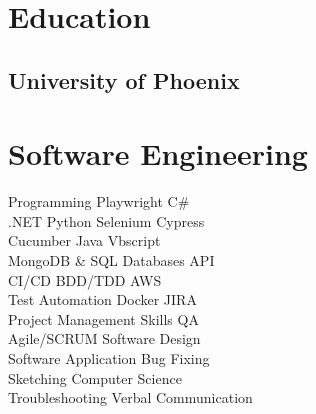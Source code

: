 \documentclass[hmargin=1.25cm, vmargin=0.75cm, scale=0.92]{deedy-resume-openfont}
\begin{document}
\lastupdated


\begin{minipage}[t]{0.33\textwidth}

\section{Education}
\subsection{University of Phoenix}
\sectionsep

\section{Software Engineering}
Programming \textbullet{} Playwright \textbullet{} C\# \\
.NET \textbullet{} Python \textbullet{} Selenium \textbullet{} Cypress \\
Cucumber \textbullet{} Java \textbullet{} Vbscript \\
MongoDB \& SQL Databases \textbullet{} API \\
CI/CD \textbullet{} BDD/TDD \textbullet{} AWS \\
Test Automation \textbullet{} Docker \textbullet{} JIRA \\
Project Management Skills \textbullet{} QA \\
Agile/SCRUM \textbullet{} Software Design \\
Software Application \textbullet{} Bug Fixing \\
Sketching \textbullet{} Computer Science \\
Troubleshooting \textbullet{} Verbal Communication
\sectionsep


\end{minipage}
\end{document}
